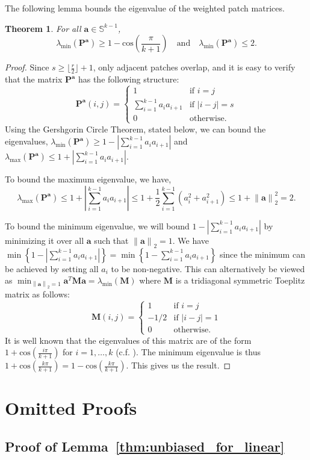 \documentclass[11pt]{article}
\newcommand{\mat}[1]{\mathbf{#1}}
\newcommand{\vect}[1]{\mathbf{#1}}
\newcommand{\norm}[1]{\left\|#1\right\|}
\newtheorem{thm}{Theorem}[section]
\begin{document}
The following lemma bounds the eigenvalue of the weighted patch matrices.
\begin{thm}\label{thm:eigen}
For all $\vect{a} \in \mathbb{S}^{k-1}$, 
\[
\lambda_{\min}\left(\mat{P}^{\vect{a}}\right) \geq 1 - \text{cos}\left(\frac{\pi}{k+1}\right) \quad \text{and} \quad \lambda_{\min}\left(\mat{P}^{\vect{a}}\right) \leq 2.
\]
\end{thm}\begin{proof}
 Since $s \geq \lfloor \frac{r}{2} \rfloor + 1$, only adjacent patches overlap, and it is easy to verify that the matrix $\mat{P}^{\vect{a}}$ has the following structure:
\[
\mat{P}^{\vect{a}}\left(i,j\right) = 	\begin{cases}
								1 &\text{if } i = j\\
								\sum_{i=1}^{k-1} a_i a_{i+1} & \text{if } |i - j| = s\\
								0 &\text{otherwise}.
							\end{cases}
\]
Using the Gershgorin Circle Theorem, stated below, we can bound the eigenvalues, $\lambda_{\min}\left(\mat{P}^{\vect{a}}\right) \geq 1 - \left|\sum_{i=1}^{k-1} a_i a_{i+1}\right|$ and $\lambda_{\max}\left(\mat{P}^{\vect{a}}\right) \leq 1 + \left|\sum_{i=1}^{k-1} a_i a_{i+1}\right|$.

To bound the maximum eigenvalue, we have,
\[
\lambda_{\max}\left(\mat{P}^{\vect{a}}\right) \leq 1 + \left|\sum_{i=1}^{k-1} a_i a_{i+1}\right| \leq 1 + \frac{1}{2}\sum_{i=1}^{k-1} \left(a_i^2 +  a_{i+1}^2\right) \leq 1 + \norm{\vect{a}}_2^2 = 2.
\]

To bound the minimum eigenvalue, we will bound $1 - \left|\sum_{i=1}^{k-1} a_i a_{i+1}\right|$ by minimizing it over all $\vect{a}$ such that $\norm{\vect{a}}_2 = 1$. We have $\min \left\{1 - \left|\sum_{i=1}^{k-1} a_i a_{i+1}\right|\right\} = \min \left\{1 - \sum_{i=1}^{k-1} a_i a_{i+1}\right\}$ since the minimum can be achieved by setting all $a_i$ to be non-negative. This can alternatively be viewed as $\min_{\norm{\vect{a}}_2 = 1} \vect{a}^T \mat{M} \vect{a} = \lambda_{\min}\left(\mat{M}\right)$ where $\mat{M}$ is a tridiagonal symmetric Toeplitz matrix as follows:
\[
\mat{M}\left(i,j\right) = 	\begin{cases}
					1 &\text{if } i = j\\
					-1/2 & \text{if } |i - j| = 1\\
					0 &\text{otherwise}.
				\end{cases}
\]
It is well known that the eigenvalues of this matrix are of the form $1 + \text{cos}\left(\frac{i\pi}{k+1}\right)$ for $i = 1, \ldots, k$ (c.f. \cite{boeottcher2005spectral}). The minimum eigenvalue is thus $1 + \text{cos}\left(\frac{k\pi}{k+1}\right) = 1 - \text{cos}\left(\frac{k\pi}{k+1}\right)$. This gives us the result.
\end{proof}\section{Omitted Proofs}\label{sec:proofs_of_section_analysis}\subsection{Proof of Lemma~\ref{thm:unbiased_for_linear}}
\end{document}

